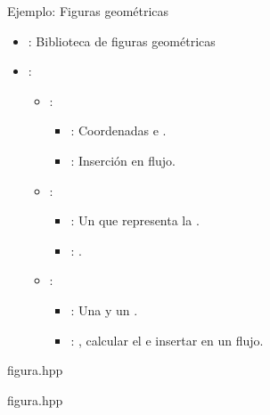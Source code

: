 \begin{frame}[t]{Ejemplo: Figuras geométricas}
\begin{itemize}
  \item {}: Biblioteca de figuras geométricas

  \item {}:
    \begin{itemize}
      \item {}: 
        \begin{itemize}
          \item {}: Coordenadas  e .
          \item {}: Inserción en flujo.
        \end{itemize}
      \item {}: 
        \begin{itemize}
          \item {}: Un  que representa la .
          \item {}: .
        \end{itemize}

      \item {}: 
        \begin{itemize}
          \item {}: Una  y un .
          \item {}: , calcular el 
                e insertar en un flujo.
        \end{itemize}
    \end{itemize}
\end{itemize}
\end{frame}

\begin{frame}[t]
\begin{block}{figura.hpp}

\end{block}
\end{frame}

\begin{frame}[t]
\begin{block}{figura.hpp}

\end{block}
\end{frame}

